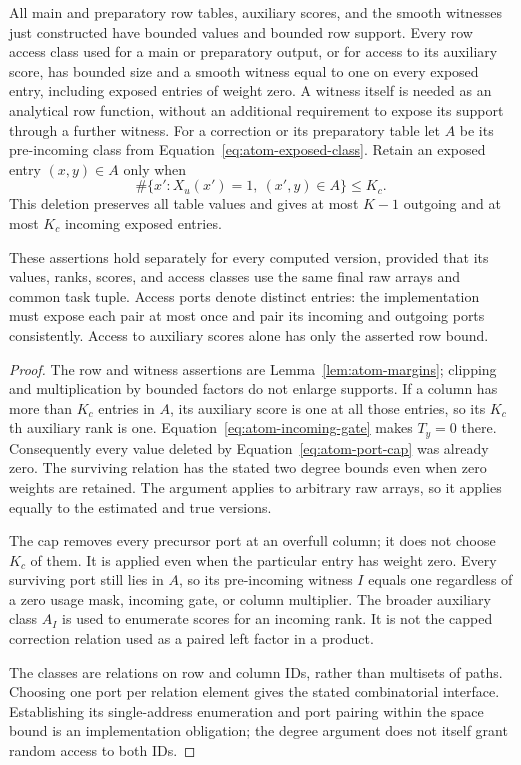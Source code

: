 \begin{lemma}
\label{lem:atom-ports}
All main and preparatory row tables, auxiliary scores, and the smooth
witnesses just constructed have bounded values and bounded row support.
Every row access class used for a main or preparatory output, or for
access to its auxiliary score, has bounded size and a smooth witness
equal to one on every exposed entry, including exposed entries of weight
zero.  A witness itself is needed as an analytical row function, without
an additional requirement to expose its support through a further
witness.  For a correction or its preparatory table let $A$ be its
pre-incoming class from Equation~\eqref{eq:atom-exposed-class}.  Retain an
exposed entry $(x,y)\in A$ only when
\begin{equation}
 \#\{x':X_u(x')=1,\ (x',y)\in A\}\le K_c.
 \label{eq:atom-port-cap}
\end{equation}
This deletion preserves all table values and gives at most $K-1$
outgoing and at most $K_c$ incoming exposed entries.

These assertions hold separately for every computed version, provided
that its values, ranks, scores, and access classes use the same final
raw arrays and common task tuple.  Access ports denote distinct entries:
the implementation must expose each pair at most once and pair its
incoming and outgoing ports consistently.  Access to auxiliary scores
alone has only the asserted row bound.
\end{lemma}

\begin{proof}
The row and witness assertions are Lemma~\ref{lem:atom-margins}; clipping
and multiplication by bounded factors do not enlarge supports.
If a column has more than $K_c$ entries in $A$, its auxiliary score is
one at all those entries, so its $K_c$th auxiliary rank is one.
Equation~\eqref{eq:atom-incoming-gate} makes $T_y=0$ there.  Consequently
every value deleted by Equation~\eqref{eq:atom-port-cap} was already zero.
The surviving relation has the stated two degree bounds even when zero
weights are retained.  The argument applies to arbitrary raw arrays, so
it applies equally to the estimated and true versions.

The cap removes every precursor port at an overfull column; it does
not choose $K_c$ of them.  It is applied even when the particular entry
has weight zero.  Every surviving port still lies in $A$, so its
pre-incoming witness $I$ equals one regardless of a zero usage mask,
incoming gate, or column multiplier.  The broader auxiliary class
$A_I$ is used to enumerate scores for an incoming rank.  It is not the
capped correction relation used as a paired left factor in a product.

The classes are relations on row and column IDs, rather than multisets
of paths.  Choosing one port per relation element gives the stated
combinatorial interface.  Establishing its single-address enumeration
and port pairing within the space bound is an implementation obligation;
the degree argument does not itself grant random access to both IDs.
\end{proof}

